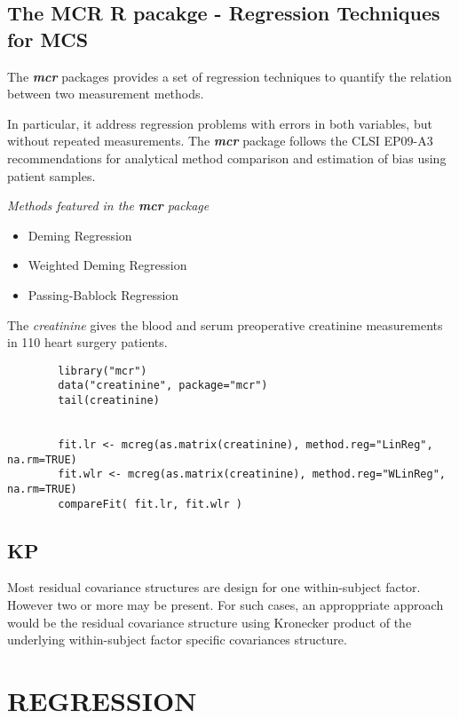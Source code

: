 \documentclass[12pt, a4paper]{report}
\theoremstyle{plain}
\theoremstyle{definition}
\theoremstyle{remark}
\begin{document}
	\section{The MCR R pacakge - Regression Techniques for MCS}
	
	The \textbf{\textit{mcr}} packages provides a set of regression techniques to quantify the relation between two measurement methods.
	
	In particular, it address regression problems with errors in both variables, but without repeated measurements.
	The \textbf{\textit{mcr}} package follows the CLSI EP09-A3 recommendations for analytical
	method comparison and estimation of bias using patient samples.
	
	
	\textit{Methods featured in the \textbf{mcr} package}
	
	\begin{itemize}
		\item Deming Regression
		\item Weighted Deming Regression
		\item Passing-Bablock Regression
	\end{itemize}
	
	The \textit{creatinine} gives the blood and serum preoperative creatinine measurements in 110 heart surgery patients.
	
	\begin{framed}
		\begin{verbatim}
		library("mcr")
		data("creatinine", package="mcr")
		tail(creatinine)
		
		
		fit.lr <- mcreg(as.matrix(creatinine), method.reg="LinReg", na.rm=TRUE)
		fit.wlr <- mcreg(as.matrix(creatinine), method.reg="WLinReg", na.rm=TRUE)
		compareFit( fit.lr, fit.wlr )
		\end{verbatim}
	\end{framed}
	
	

	\section{KP}
	Most residual covariance structures are design for one
	within-subject factor. However two or more may be present. For
	such cases, an approppriate approach would be the residual
	covariance structure using Kronecker product of the underlying
	within-subject factor specific covariances structure.
	
	

\chapter{REGRESSION}%
\end{document}
